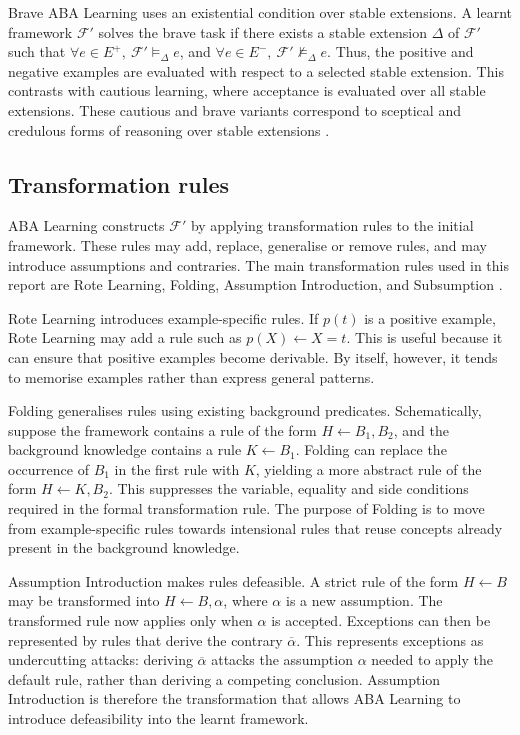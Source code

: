 Brave ABA Learning uses an existential condition over stable extensions. A learnt framework \(\mathcal{F}'\) solves the brave task if there exists a stable extension \(\Delta\) of \(\mathcal{F}'\) such that \(\forall e \in E^+,\ \mathcal{F}' \models_{\Delta} e\), and \(\forall e \in E^-,\ \mathcal{F}' \not\models_{\Delta} e\). Thus, the positive and negative examples are evaluated with respect to a selected stable extension. This contrasts with cautious learning, where acceptance is evaluated over all stable extensions. These cautious and brave variants correspond to sceptical and credulous forms of reasoning over stable extensions \cite{de2023aba,de2024learning}.

\subsection{Transformation rules}

ABA Learning constructs \(\mathcal{F}'\) by applying transformation rules to the initial framework. These rules may add, replace, generalise or remove rules, and may introduce assumptions and contraries. The main transformation rules used in this report are Rote Learning, Folding, Assumption Introduction, and Subsumption \cite{proietti2022learning,de2023aba,de2024learning}.

Rote Learning introduces example-specific rules. If \(p(t)\) is a positive example, Rote Learning may add a rule such as \(p(X) \leftarrow X=t\). This is useful because it can ensure that positive examples become derivable. By itself, however, it tends to memorise examples rather than express general patterns.

Folding generalises rules using existing background predicates. Schematically, suppose the framework contains a rule of the form \(H \leftarrow B_1, B_2\), and the background knowledge contains a rule \(K \leftarrow B_1\). Folding can replace the occurrence of \(B_1\) in the first rule with \(K\), yielding a more abstract rule of the form \(H \leftarrow K, B_2\). This suppresses the variable, equality and side conditions required in the formal transformation rule. The purpose of Folding is to move from example-specific rules towards intensional rules that reuse concepts already present in the background knowledge.

Assumption Introduction makes rules defeasible. A strict rule of the form \(H \leftarrow B\) may be transformed into \(H \leftarrow B, \alpha\), where \(\alpha\) is a new assumption. The transformed rule now applies only when \(\alpha\) is accepted. Exceptions can then be represented by rules that derive the contrary \(\overline{\alpha}\). This represents exceptions as undercutting attacks: deriving \(\overline{\alpha}\) attacks the assumption \(\alpha\) needed to apply the default rule, rather than deriving a competing conclusion. Assumption Introduction is therefore the transformation that allows ABA Learning to introduce defeasibility into the learnt framework.

